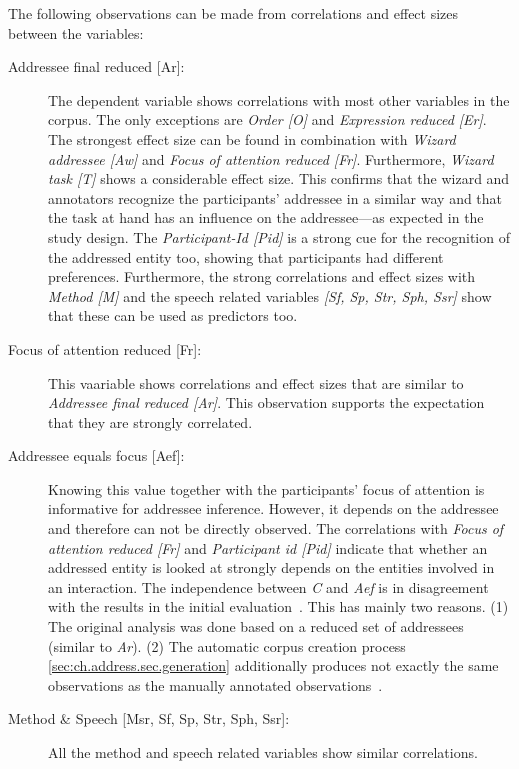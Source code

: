 The following observations can be made from correlations and effect sizes between the variables:
\begin{description}
    \item[{Addressee final reduced [Ar]:}] The dependent variable shows correlations with most other variables in the corpus.
    The only exceptions are \emph{Order [O]} and \emph{Expression reduced [Er]}.
    The strongest effect size can be found in combination with \emph{Wizard \gls{addressee} [Aw]} and \emph{Focus of attention reduced [Fr]}.
    Furthermore, \emph{Wizard task [T]} shows a considerable effect size.
    This confirms that the \gls{wizard} and annotators recognize the participants' \gls{addressee} in a similar way and that the task at hand has an influence on the \gls{addressee}---as expected in the study design.
    The \emph{Participant-Id [Pid]} is a strong cue for the recognition of the addressed entity too, showing that participants had different preferences.
    Furthermore, the strong correlations and effect sizes with \emph{Method [M]} and the speech related variables \emph{[Sf, Sp, Str, Sph, Ssr]} show that these can be used as predictors too.
    \item[{Focus of attention reduced [Fr]:}] This vaariable shows correlations and effect sizes that are similar to \emph{Addressee final reduced [Ar]}.
    This observation supports the expectation that they are strongly correlated.
    \item[{Addressee equals focus [Aef]:}] Knowing this value together with the participants' focus of attention is informative for \gls{addressee} inference.
    However, it depends on the \gls{addressee} and therefore can not be directly observed.
    The correlations with \emph{Focus of attention reduced [Fr]} and \emph{Participant id [Pid]} indicate that whether an addressed entity is looked at strongly depends on the entities involved in an interaction.
    The independence between \emph{C} and \emph{Aef} is in disagreement with the results in the initial evaluation~\cite{Richter2016}.
    This has mainly two reasons.
    (1) The original analysis was done based on a reduced set of \glspl{addressee} (similar to \emph{Ar}).
    (2) The automatic corpus creation process \ref{sec:ch.address.sec.generation} additionally produces not exactly the same observations as the manually annotated observations~\cite{Richter2016}.
    \item[{Method \& Speech [Msr, Sf, Sp, Str, Sph, Ssr]:}] All the method and speech related variables show similar correlations. 

\end{description}
